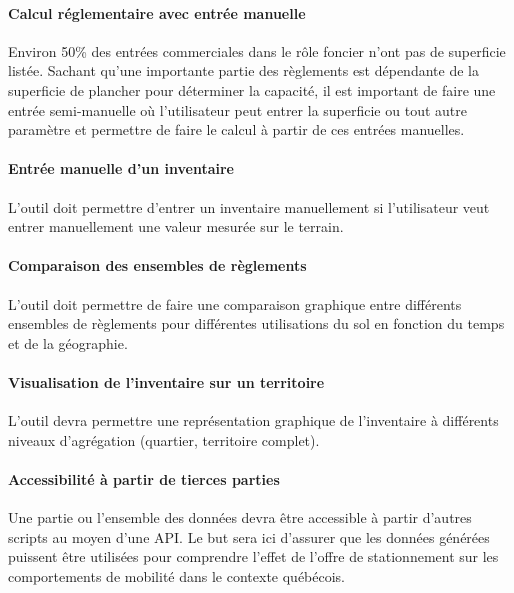\paragraph{Calcul réglementaire avec entrée manuelle}
Environ 50\% des entrées commerciales dans le rôle foncier n'ont pas de superficie listée. Sachant qu'une importante partie des règlements est dépendante de la superficie de plancher pour déterminer la capacité, il est important de faire une entrée semi-manuelle où l'utilisateur peut entrer la superficie ou tout autre paramètre et permettre de faire le calcul à partir de ces entrées manuelles.  
\paragraph{Entrée manuelle d'un inventaire}
L'outil doit permettre d'entrer un inventaire manuellement si l'utilisateur veut entrer manuellement une valeur mesurée sur le terrain.
\paragraph{Comparaison des ensembles de règlements} L'outil doit permettre de faire une comparaison graphique entre différents ensembles de règlements pour différentes utilisations du sol en fonction du temps et de la géographie.
\paragraph{Visualisation de l'inventaire sur un territoire} L'outil devra permettre une représentation graphique de l'inventaire à différents niveaux d'agrégation (quartier, territoire complet).
\paragraph{Accessibilité à partir de tierces parties} Une partie ou l'ensemble des données devra être accessible à partir d'autres scripts au moyen d'une API. Le but sera ici d'assurer que les données générées puissent être utilisées pour comprendre l'effet de l'offre de stationnement sur les comportements de mobilité dans le contexte québécois.

